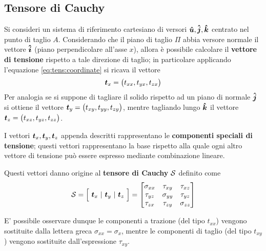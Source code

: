 	\subsection{Tensore di Cauchy}
		Si consideri un sistema di riferimento cartesiano di versori $\vers u, \vers j, \vers k$ centrato nel punto di taglio $A$. Considerando che il piano di taglio $\Pi$ abbia versore normale il vettore $\vers i$ (piano perpendicolare all'asse $x$), allora è possibile calcolare il \textbf{vettore di tensione} rispetto a tale direzione di taglio; in particolare applicando l'equazione \ref{eq:tens:coordinate} si ricava il vettore
		\[  \ov t_x = \big(t_{xx}, t_{yx}, t_{zx}\big) \]
		Per analogia se si suppone di tagliare il solido rispetto ad un piano di normale $\vers j$ si ottiene il vettore $\ov t_y = \big(t_{xy}, t_{yy}, t_{zy}\big)$, mentre tagliando lungo $\vers k$ il vettore	$\ov t_z = \big(t_{xz}, t_{yz}, t_{zz}\big)$.
		
		\begin{concetto}
			I vettori $\ov t_x,\ov t_y,\ov t_z$ appenda descritti rappresentano le \textbf{componenti speciali di tensione}; questi vettori rappresentano la base rispetto alla quale ogni altro vettore di tensione può essere espresso mediante combinazione lineare.
			
			Questi vettori danno origine al \textbf{tensore di Cauchy} $\S$ definito come
			\[ \S = \Big[ \ \ov t_x \ | \ \ov t_y \ | \ \ov t_z \ \Big] = \begin{bmatrix}
				\sigma_{xx} & \tau_{xy} & \tau_{xz} \\ \tau_{yz} & \sigma_{yy} & \tau_{yz} \\ \tau_{zx} & \tau_{zy} & \sigma_{zz}
			\end{bmatrix}\]
		\end{concetto}
		\begin{nota}
			E' possibile osservare dunque le componenti a trazione (del tipo $t_{xx}$) vengono sostituite dalla lettera greca $\sigma_{xx} = \sigma_x$, mentre le componenti di taglio (del tipo $t_{xy}$) vengono sostituite dall'espressione $\tau_{xy}$.
		\end{nota}
	
	
	
	
	
	
	
	
	
	
	
	
	
	
	
	
	
	
	
	
	
	
	
	
	
	
	
	